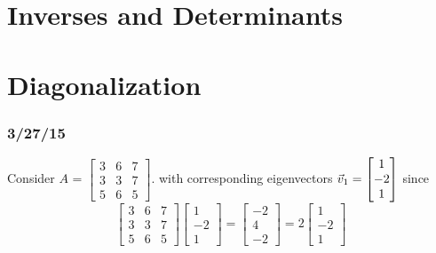 \documentclass[english, 12pt]{article}
\begin{document}
\section{Inverses and Determinants}

\section{Diagonalization}


\subsubsection*{3/27/15}


\begin{exmp}
Consider $A$ = $\begin{bmatrix} 3 & 6 & 7 \\ 3 & 3 & 7 \\ 5 & 6 & 5 \end{bmatrix}$. with corresponding eigenvectors $\vec{v}_{1} = \begin{bmatrix} 1 \\ -2 \\ 1 \end{bmatrix}$ since
\[\begin{bmatrix} 3 & 6 & 7 \\ 3 & 3 & 7 \\ 5 & 6 & 5 \end{bmatrix} \begin{bmatrix} 1 \\ -2 \\ 1 \end{bmatrix} = \begin{bmatrix} -2 \\ 4 \\ -2 \end{bmatrix} = 2 \begin{bmatrix} 1 \\ -2 \\ 1 \end{bmatrix}\]
\end{exmp}
\end{document}
